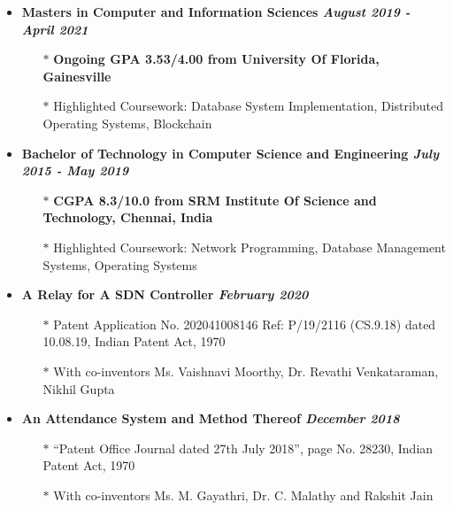 \documentclass[10]{Resume}
\begin{document}
\begin{itemize}[noitemsep,nolistsep]
	\item\textbf{Masters in Computer and Information Sciences \hfill \textit{August 2019 - April 2021}}
		\begin{itemize}[leftmargin=*]
			\setlength\itemsep{-0.25em}
			\item[$\ast$]\textbf{Ongoing GPA 3.53/4.00 from University Of Florida, Gainesville}
			\item[$\ast$]Highlighted Coursework: Database System Implementation, Distributed Operating Systems, Blockchain
		\end{itemize}
	\item\textbf{Bachelor of Technology in Computer Science and Engineering \hfill \textit{July 2015 - May 2019}}
		\begin{itemize}[leftmargin=*]
			\setlength\itemsep{-0.25em}
			\item[$\ast$]\textbf{CGPA 8.3/10.0 from SRM Institute Of Science and Technology, Chennai, India}
			\item[$\ast$]Highlighted Coursework: Network Programming, Database Management Systems, Operating Systems
		\end{itemize}
\end{itemize}

\begin{itemize}[noitemsep,nolistsep]
	\item\textbf{A Relay for A SDN Controller \hfill \textit{February 2020}}
		\begin{itemize}[leftmargin=*]
			\setlength\itemsep{-0.25em}
			\item[$\ast$]Patent Application No. 202041008146 Ref: P/19/2116 (CS.9.18) dated 10.08.19, Indian Patent Act, 1970
			\item[$\ast$]With co-inventors Ms. Vaishnavi Moorthy, Dr. Revathi Venkataraman, Nikhil Gupta
		\end{itemize}
	\item\textbf{An Attendance System and Method Thereof \hfill \textit{December 2018}}
		\begin{itemize}[leftmargin=*]
			\setlength\itemsep{-0.25em}
			\item[$\ast$]``Patent Office Journal dated 27th July 2018'', page No. 28230, Indian Patent Act, 1970
			\item[$\ast$]With co-inventors Ms. M. Gayathri, Dr. C. Malathy and Rakshit Jain
		\end{itemize}
\end{itemize}
\end{document}
